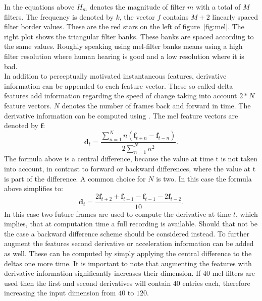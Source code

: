 In the equations above $H_m$ denotes the magnitude of filter $m$ with a total of $M$ filters. The frequency is denoted by $k$, the vector $f$ contains $M+2$ linearly spaced filter border values. These are the red stars on the left of  figure~\ref{fig:mel}. The right plot shows the triangular filter banks. These banks are spaced according to the same values. Roughly speaking using mel-filter banks means using a high filter resolution where human hearing is good and a low resolution where it is bad. \\
In addition to perceptually motivated instantaneous features, derivative information can be appended to each feature vector. These so called delta features add information
regarding the speed of change taking into account $2*N$ feature vectors. $N$ denotes the number of frames back and forward in time. The derivative information can be computed using \cite{Woodland2006}. The mel feature vectors are denoted by $\mathbf{f}$:
\begin{equation}
\mathbf{d}_t = \frac{\sum\limits_{n=1}^{N} n (\mathbf{f}_{t+n}- \mathbf{f}_{t-n})}{2 \sum\limits_{n=1}^{N} n^2}.
\end{equation}
The formula above is a central difference, because the value at time t is not taken into account, in contrast to forward or backward differences, where the value at t is part of the difference. A common choice for $N$ is two. In this case the formula above simplifies to:
\begin{equation}
\mathbf{d}_t = \frac{2\mathbf{f}_{t+2} + \mathbf{f}_{t+1} - \mathbf{f}_{t-1} - 2\mathbf{f}_{t-2}}{10}.
\end{equation}
In this case two future frames are used to compute the derivative at time $t$, which implies, that at computation time a full recording is available. Should that not be the case a backward difference scheme should be considered instead. To further augment the features second derivative or acceleration information can be added as well. These can be computed by simply applying the central difference to the deltas one more time. It is important to note that augmenting the features with derivative information significantly increases their dimension. If 40 mel-filters are used then the first and second derivatives will contain 40 entries each, therefore increasing the input dimension from $40$ to $120$.

